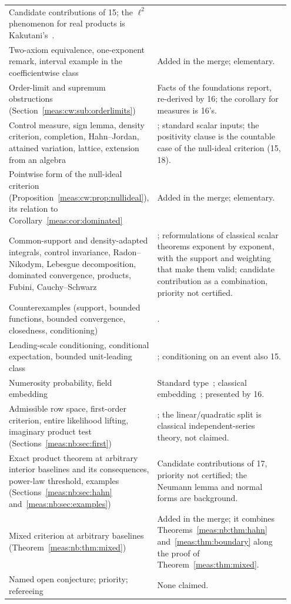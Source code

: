 \documentclass[11pt]{article}
\numberwithin{equation}{section}
\theoremstyle{definition}
\theoremstyle{remark}
\begin{document}
\begin{longtable}{@{}>{\raggedright\arraybackslash}p{0.38\linewidth}
                    >{\raggedright\arraybackslash}p{0.57\linewidth}@{}}
Candidate contributions of 15; the $\ell^2$ phenomenon for real products is
Kakutani's~\cite{Kakutani}.\\[3pt]
Two-axiom equivalence, one-exponent remark, interval example in the coefficientwise
class & Added in the merge; elementary.\\[3pt]
Order-limit and supremum obstructions (Section~\ref{meas:cw:sub:orderlimits}) &
Facts of the foundations report, re-derived by 16; the corollary for measures is
16's.\\[3pt]
Control measure, sign lemma, density criterion, completion, Hahn--Jordan, attained
variation, lattice, extension from an algebra & 16; standard scalar inputs; the
positivity clause is the countable case of the null-ideal criterion (15, 18).\\[3pt]
Pointwise form of the null-ideal criterion
(Proposition~\ref{meas:cw:prop:nullideal}), its relation to
Corollary~\ref{meas:cor:dominated} & Added in the merge; elementary.\\[3pt]
Common-support and density-adapted integrals, control invariance, Radon--Nikodym,
Lebesgue decomposition, dominated convergence, products, Fubini, Cauchy--Schwarz &
16; reformulations of classical scalar theorems exponent by exponent, with the
support and weighting that make them valid; candidate contribution as a
combination, priority not certified.\\[3pt]
Counterexamples (support, bounded functions, bounded convergence, closedness,
conditioning) & 16.\\[3pt]
Leading-scale conditioning, conditional expectation, bounded unit-leading class &
16; conditioning on an event also 15.\\[3pt]
Numerosity probability, field embedding & Standard type~\cite{BHW,BBDN}; classical
embedding~\cite{Conway,Gonshor}; presented by 16.\\[3pt]
Admissible row space, first-order criterion, entire likelihood lifting,
imaginary product test (Sections~\ref{meas:nb:sec:first}) & 17; the linear/quadratic
split is classical independent-series theory, not claimed.\\[3pt]
Exact product theorem at arbitrary interior baselines and its consequences,
power-law threshold, examples (Sections~\ref{meas:nb:sec:hahn}
and~\ref{meas:nb:sec:examples}) & Candidate contributions of 17, priority not
certified; the Neumann lemma and normal forms are background.\\[3pt]
Mixed criterion at arbitrary baselines (Theorem~\ref{meas:nb:thm:mixed}) & Added in
the merge; it combines Theorems~\ref{meas:nb:thm:hahn} and~\ref{meas:thm:boundary}
along the proof of Theorem~\ref{meas:thm:mixed}.\\[3pt]
Named open conjecture; priority; refereeing & None claimed.\\
\bottomrule
\end{longtable}
\endgroup
\end{document}
